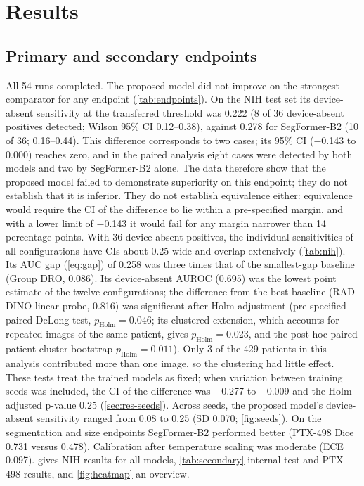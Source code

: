 \documentclass{ieeeaccess}
\begin{document}
\section{Results}
\label{sec:results}

\subsection{Primary and secondary endpoints}
\label{sec:res-endpoints}
All 54 runs completed. The proposed model did not improve on the strongest comparator for any endpoint (\cref{tab:endpoints}). On the NIH test set its device-absent sensitivity at the transferred threshold was 0.222 (8 of 36 device-absent positives detected; Wilson 95\% CI 0.12--0.38), against 0.278 for SegFormer-B2 (10 of 36; 0.16--0.44). This difference corresponds to two cases; its 95\% CI ($-$0.143 to 0.000) reaches zero, and in the paired analysis eight cases were detected by both models and two by SegFormer-B2 alone. The data therefore show that the proposed model failed to demonstrate superiority on this endpoint; they do not establish that it is inferior. They do not establish equivalence either: equivalence would require the CI of the difference to lie within a pre-specified margin, and with a lower limit of $-$0.143 it would fail for any margin narrower than 14 percentage points. With 36 device-absent positives, the individual sensitivities of all configurations have CIs about 0.25 wide and overlap extensively (\cref{tab:nih}). Its AUC gap (\cref{eq:gap}) of 0.258 was three times that of the smallest-gap baseline (Group DRO, 0.086). Its device-absent AUROC (0.695) was the lowest point estimate of the twelve configurations; the difference from the best baseline (RAD-DINO linear probe, 0.816) was significant after Holm adjustment (pre-specified paired DeLong test, $p_\text{Holm}=0.046$; its clustered extension, which accounts for repeated images of the same patient, gives $p_\text{Holm}=0.023$, and the post hoc paired patient-cluster bootstrap $p_\text{Holm}=0.011$). Only 3 of the 429 patients in this analysis contributed more than one image, so the clustering had little effect. These tests treat the trained models as fixed; when variation between training seeds was included, the CI of the difference was $-$0.277 to $-$0.009 and the Holm-adjusted p-value 0.25 (\cref{sec:res-seeds}). Across seeds, the proposed model's device-absent sensitivity ranged from 0.08 to 0.25 (SD 0.070; \cref{fig:seeds}). On the segmentation and size endpoints SegFormer-B2 performed better (PTX-498 Dice 0.731 versus 0.478). Calibration after temperature scaling was moderate (ECE 0.097).  gives NIH results for all models, \cref{tab:secondary} internal-test and PTX-498 results, and \cref{fig:heatmap} an overview.
\end{document}
